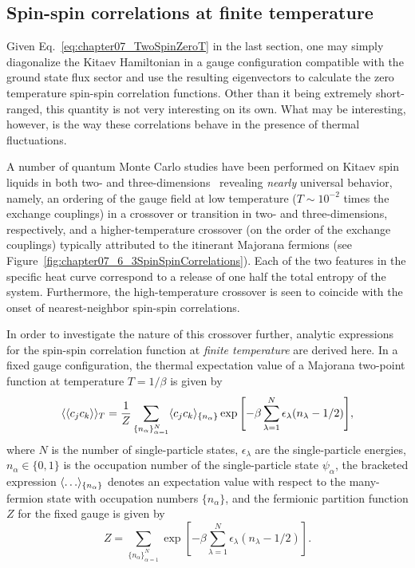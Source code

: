 \subsection{Spin-spin correlations at finite temperature}
\label{section:chapter07_SpinSpinCorrelationsFiniteTemperature}
%
%
Given Eq.~\eqref{eq:chapter07_TwoSpinZeroT} in the last section, one may simply diagonalize the Kitaev Hamiltonian in a gauge configuration compatible with the ground state flux sector and use the resulting eigenvectors to calculate the zero temperature spin-spin correlation functions.
Other than it being extremely short-ranged, this quantity is not very interesting on its own.
What may be interesting, however, is the way these correlations behave in the presence of thermal fluctuations.

A number of quantum Monte Carlo studies have been performed on Kitaev spin liquids in both two- and three-dimensions~\cite{NasuPRB2014,NasuPRL2014,NasuJoP2015,NasuPRB2015,NasuPRL2015,NasuJoP2016,MischenkoPRB2017,EschmannPRL2019} revealing \textit{nearly} universal behavior, namely, an ordering of the gauge field at low temperature ($T \sim 10^{-2}$ times the exchange couplings) in a crossover or transition in two- and three-dimensions, respectively, and a higher-temperature crossover (on the order of the exchange couplings) typically attributed to the itinerant Majorana fermions (see Figure~\ref{fig:chapter07_6_3SpinSpinCorrelations}).
Each of the two features in the specific heat curve correspond to a release of one half the total entropy of the system.
Furthermore, the high-temperature crossover is seen to coincide with the onset of nearest-neighbor spin-spin correlations.

In order to investigate the nature of this crossover further, analytic expressions for the spin-spin correlation function at \textit{finite temperature} are derived here.
In a fixed gauge configuration, the thermal expectation value of a Majorana two-point function at temperature $T=1/\beta$ is given by
%
\begin{equation}
	\langle \langle c_j c_k \rangle \rangle_{T} = \frac{1}{Z} \sum_{\{n_\alpha\}_{\alpha=1}^N} \langle c_j c_k \rangle_{\{n_\alpha\}} \exp{\left[ -\beta\sum_{\lambda=1}^N \epsilon_\lambda (n_\lambda-1/2) \right]},
\end{equation}
%
where $N$ is the number of single-particle states, $\epsilon_{\lambda}$ are the single-particle energies, $n_\alpha \in \{ 0, 1\}$ is the occupation number of the single-particle state $\psi_\alpha$, the bracketed expression $\langle \ldots \rangle_{\{n_\alpha\}}$ denotes an expectation value with respect to the many-fermion state with occupation numbers $\{n_\alpha\}$, and the fermionic partition function $Z$ for the fixed gauge is given by
%
\begin{equation}
	Z = \sum_{\{n_\alpha\}_{\alpha=1}^N} \exp{\left[ -\beta \sum_{\lambda=1}^N \epsilon_\lambda (n_\lambda - 1/2) \right]}.
\end{equation}
%

